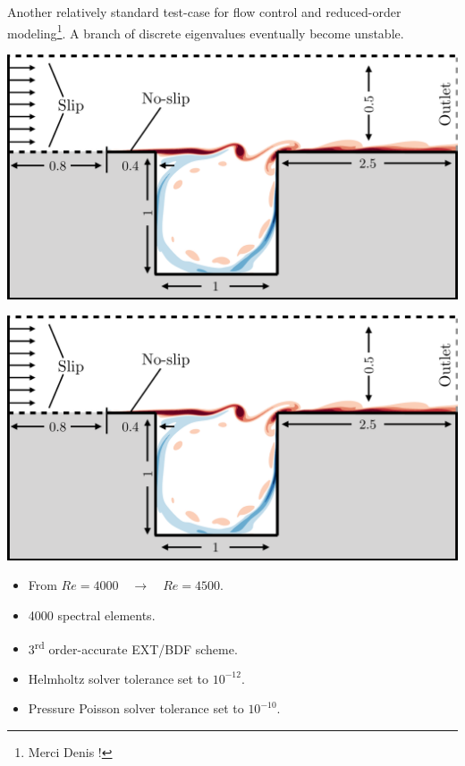 \documentclass[aspectratio=169, usenames, dvipsnames]{beamer}
\begin{document}
{\begin{frame}
  \vfill
  \begin{minipage}{.68\textwidth}
    Another relatively standard test-case for flow control and reduced-order modeling\footnote{Merci Denis !}.
    A branch of discrete eigenvalues eventually become unstable.
  \end{minipage}%
  \hfill
  \begin{minipage}{.28\textwidth}
    \includegraphics[width=\textwidth]{domain}
  \end{minipage}
  \vfill
\end{frame}


\begin{frame}
  \vfill
  \vfill
  \begin{minipage}{.28\textwidth}
    \centering
    \includegraphics[width=\textwidth]{domain}
  \end{minipage}%
  \hfill
  \begin{minipage}{.68\textwidth}
    \begin{itemize}
    \item From $Re = 4000 \quad \to \quad Re = 4500$.\\
      \medskip
    \item 4000 spectral elements.
      \medskip
    \item 3\textsuperscript{rd} order-accurate EXT/BDF scheme.
      \medskip
    \item Helmholtz solver tolerance set to $10^{-12}$.
      \medskip
    \item Pressure Poisson solver tolerance set to $10^{-10}$.
    \end{itemize}
  \end{minipage}
  \vfill
\end{frame}


}
\end{document}
